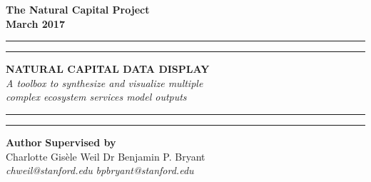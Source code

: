 
\begin{titlingpage}
\begin{center}
\Large
\textbf{The Natural Capital Project} \\
\vspace{1cm}
\textbf{March 2017}
\vspace{3cm}
\hrule
\vspace{0.1cm}
\hrule
\vspace{1cm}
\Huge
\textbf{NATURAL CAPITAL DATA DISPLAY} \\

\vspace{0.4cm}
\huge
\textit{A toolbox to synthesize and visualize multiple} \\
\textit{complex ecosystem services model outputs} \\

\vspace{1.5cm}
\hrule
\vspace{0.1cm}
\hrule

\end{center}
\vfill
\noindent \textbf{Author} \hfill \textbf{Supervised by}\\
Charlotte Gisèle Weil \hfill Dr Benjamin P. Bryant \\
\textit{chweil@stanford.edu} \hfill \textit{bpbryant@stanford.edu}\\
\vspace{0.5cm}



\noindent

\end{titlingpage}

